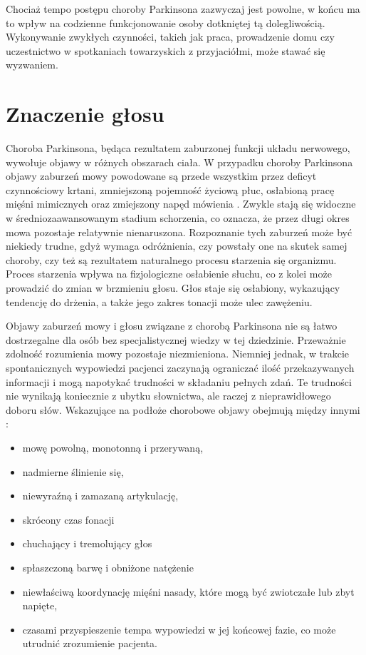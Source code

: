 Chociaż tempo postępu choroby Parkinsona zazwyczaj jest powolne, w końcu ma to wpływ na codzienne funkcjonowanie osoby dotkniętej tą dolegliwością.
Wykonywanie zwykłych czynności, takich jak praca, prowadzenie domu czy uczestnictwo w spotkaniach towarzyskich z przyjaciółmi, może stawać się wyzwaniem.


\section{Znaczenie głosu}
\label{sec:znaczenie_glosu}
Choroba Parkinsona, będąca rezultatem zaburzonej funkcji układu nerwowego, wywołuje objawy w różnych obszarach ciała.
W przypadku choroby Parkinsona objawy zaburzeń mowy powodowane są przede wszystkim przez deficyt czynnościowy krtani, zmniejszoną pojemność życiową płuc,
osłabioną pracę mięśni mimicznych oraz zmiejszony napęd mówienia \cite{lewicka}.
Zwykle stają się widoczne w średniozaawansowanym stadium schorzenia, co oznacza, że przez długi okres mowa pozostaje relatywnie nienaruszona.
Rozpoznanie tych zaburzeń może być niekiedy trudne, gdyż wymaga odróżnienia, czy powstały one na skutek samej choroby, czy też są rezultatem naturalnego
procesu starzenia się organizmu.
Proces starzenia wpływa na fizjologiczne osłabienie słuchu, co z kolei może prowadzić do zmian w brzmieniu głosu.
Głos staje się osłabiony, wykazujący tendencję do drżenia, a także jego zakres tonacji może ulec zawężeniu.

Objawy zaburzeń mowy i głosu związane z chorobą Parkinsona nie są łatwo dostrzegalne dla osób bez specjalistycznej wiedzy w tej dziedzinie.
Przeważnie zdolność rozumienia mowy pozostaje niezmieniona.
Niemniej jednak, w trakcie spontanicznych wypowiedzi pacjenci zaczynają ograniczać ilość przekazywanych informacji i mogą napotykać trudności w składaniu
pełnych zdań.
Te trudności nie wynikają koniecznie z ubytku słownictwa, ale raczej z nieprawidłowego doboru słów.
Wskazujące na podłoże chorobowe objawy obejmują między innymi \cite{Szurek_2018, Kuryłowicz_2019}:
\begin{itemize}[itemsep=0.1pt]
	\item mowę powolną, monotonną i przerywaną,
	\item nadmierne ślinienie się,
	\item niewyraźną i zamazaną artykulację,
	\item skrócony czas fonacji
	\item chuchający i tremolujący głos
	\item spłaszczoną barwę i obniżone natężenie
	\item niewłaściwą koordynację mięśni nasady, które mogą być zwiotczałe lub zbyt napięte,
	\item czasami przyspieszenie tempa wypowiedzi w jej końcowej fazie, co może utrudnić zrozumienie pacjenta.
\end{itemize}

